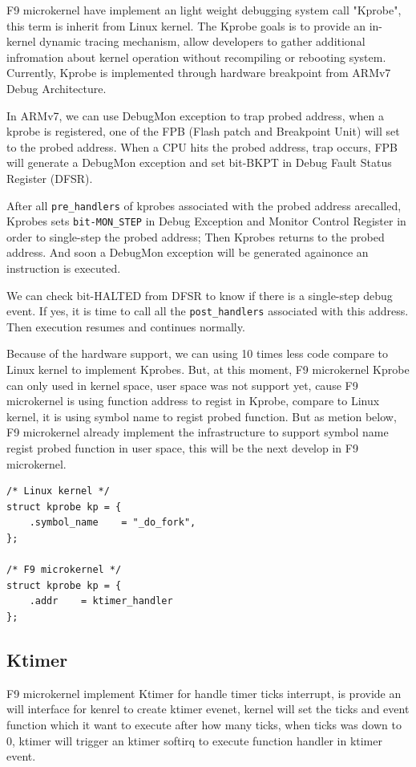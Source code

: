 \documentclass[10pt,preprint,nocopyrightspace]{sigplanconf}
\begin{document}
F9 microkernel have implement an light weight debugging system call "Kprobe", this term is inherit from Linux kernel. The Kprobe goals is to provide an in-kernel dynamic tracing mechanism, allow developers to gather additional infromation about kernel operation without recompiling or rebooting system. Currently, Kprobe is implemented through hardware breakpoint from ARMv7 Debug Architecture. 

In ARMv7, we can use DebugMon exception to trap probed address\cite{yiu2013definitive}, when a kprobe is registered, one of the FPB (Flash patch and Breakpoint Unit) will set to the probed address. When a CPU hits the probed address, trap occurs, FPB will generate a DebugMon exception and set bit-BKPT in Debug Fault Status Register (DFSR).

After all \texttt{pre\_handlers} of kprobes associated with the probed address arecalled, Kprobes sets \texttt{bit-MON\_STEP} in Debug Exception and Monitor Control Register in order to single-step the probed address; Then Kprobes returns to
the probed address. And soon a DebugMon exception will be generated againonce an instruction is executed.

We can check bit-HALTED from DFSR to know if there is a single-step debug event. If yes, it is time to call all the \texttt{post\_handlers} associated with this address. Then execution resumes and continues normally.

Because of the hardware support, we can using 10 times less code compare to Linux kernel to implement Kprobes. But, at this moment, F9 microkernel Kprobe can only used in kernel space, user space was not support yet, cause F9 microkernel is using function address to regist in Kprobe, compare to Linux kernel, it is using symbol name to regist 
probed function. But as metion below, F9 microkernel already implement the infrastructure to support symbol name regist probed function in user space, this will be the next develop in F9 microkernel.

\begin{lstlisting}[basicstyle=\small,frame=single]
/* Linux kernel */
struct kprobe kp = {
    .symbol_name    = "_do_fork",
};

/* F9 microkernel */
struct kprobe kp = {
    .addr    = ktimer_handler
};

\end{lstlisting}

\subsection{Ktimer}
F9 microkernel implement Ktimer for handle timer ticks interrupt, is provide an will interface for kenrel to create ktimer evenet, kernel will set the ticks and event function which it want to execute after how many ticks, when ticks was down to 0, ktimer will trigger an ktimer softirq to execute function handler in ktimer event. 
\end{document}
